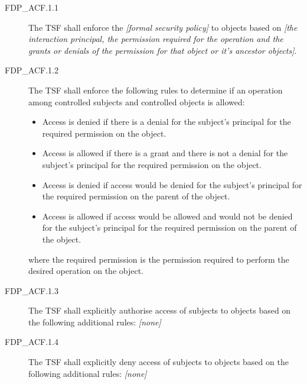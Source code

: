 \documentclass[12pt,english]{scrbook}
\begin{document}



\begin{description}
\item[FDP{\_}ACF.1.1]

The TSF shall enforce the \emph{{[}formal security policy]} to objects
based on \emph{{[}the interaction principal, the permission required for
the operation and the grants or denials of the permission for that
object or it's ancestor objects]}.

\item[FDP{\_}ACF.1.2]

The TSF shall enforce the following rules to determine
if an operation among controlled subjects and controlled objects is
allowed:
\begin{itemize}
\item {} 
Access is denied if there is a denial for the subject's
principal for the required permission on the object.

\item {} 
Access is allowed if there is a grant and there is not a denial
for the subject's principal for the required permission on the object.

\item {} 
Access is denied if access would be denied for the subject's
principal for the required permission on the parent of the
object.

\item {} 
Access is allowed if access would be allowed and would not be
denied for the subject's principal for the required permission
on the parent of the object.

\end{itemize}

where the required permission is the permission required to
perform the desired operation on the object.

\item[FDP{\_}ACF.1.3]

The TSF shall explicitly authorise access of subjects to
objects based on the following additional rules: \emph{{[}none]}

\item[FDP{\_}ACF.1.4]

The TSF shall explicitly deny access of subjects to objects
based on the following additional rules: \emph{{[}none]}

\end{description}
\end{document}
